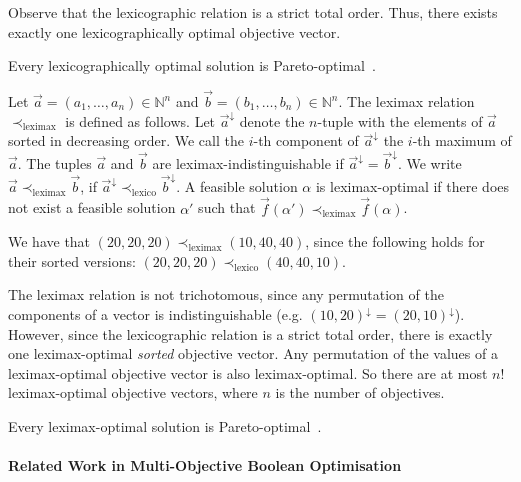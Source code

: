 \documentclass[a4paper,UKenglish,cleveref, autoref, thm-restate]{lipics-v2021}
\begin{document}
Observe that the lexicographic relation is a strict total order. Thus, there exists exactly one lexicographically optimal objective vector.

\begin{proposition}
Every lexicographically optimal solution is Pareto-optimal~\cite{ehrgott}.
\end{proposition}

\begin{definition}
Let $\vec{a}=(a_1,\dots,a_n)\in \mathbb{N}^n$ and $\vec{b}=(b_1,\dots,b_n)\in \mathbb{N}^n$. The leximax relation $\prec_{\text{leximax}}$ is defined as follows. Let $\vec{a}^{\downarrow}$ denote the $n$-tuple with the elements of $\vec{a}$ sorted in decreasing order. We call the $i$-th component of $\vec{a}^{\downarrow}$ the $i$-th maximum of $\vec{a}$. The tuples $\vec{a}$ and $\vec{b}$ are leximax-indistinguishable if $\vec{a}^\downarrow=\vec{b}^\downarrow$. We write $\vec{a} \prec_{\text{leximax}} \vec{b}$, if $\vec{a}^{\downarrow} \prec_{\text{lexico}} \vec{b}^\downarrow$. A feasible solution $\alpha$ is leximax-optimal if there does not exist a feasible solution $\alpha'$ such that $\vec{f}(\alpha')\prec_{\text{leximax}}\vec{f}(\alpha)$.
\end{definition}

\begin{example}
We have that $(20,20,20)  \prec_{\text{leximax}} (10,40,40)$, since the following holds for their sorted versions: $(20,20,20)  \prec_{\text{lexico}} (40,40,10)$.
\end{example}

The leximax relation is not trichotomous, since any permutation of the components of a vector is indistinguishable (e.g. $(10,20)^\downarrow=(20,10)^\downarrow$). However, since the lexicographic relation is a strict total order, there is exactly one leximax-optimal \emph{sorted} objective vector. Any permutation of the values of a leximax-optimal objective vector is also leximax-optimal. So there are at most $n!$ leximax-optimal objective vectors, where $n$ is the number of objectives.

\begin{proposition}
Every leximax-optimal solution is Pareto-optimal~\cite{ehrgott}.
\end{proposition}

\paragraph*{Related Work in Multi-Objective Boolean Optimisation}
\end{document}
